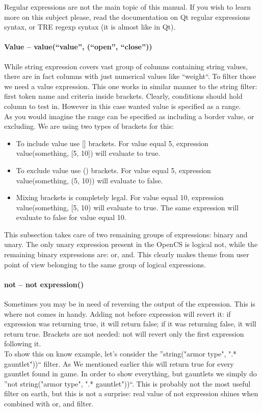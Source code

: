 Regular expressions are not the main topic of this manual. If you wish to learn more on this subject please, read the documentation on Qt regular expressions syntax, or TRE regexp syntax (it is almost like in Qt).

\paragraph{Value -- value(``value'', (``open'', ``close''))}
While string expression covers vast group of columns containing string values, there are in fact columns with just numerical values like ``weight``. To filter those we need a value expression. This one works in similar manner to the string filter: first token name and criteria inside brackets. Clearly, conditions should hold column to test in. However in this case wanted value is specified as a range.\\
As you would imagine the range can be specified as including a border value, or excluding. We are using two types of brackets for this:
\begin{itemize}
 \item To include value use [] brackets. For value equal 5, expression value(something, [5, 10]) will evaluate to true.
 \item To exclude value use () brackets. For value equal 5, expression value(something, (5, 10)) will evaluate to false.
 \item Mixing brackets is completely legal. For value equal 10, expression value(something, [5, 10) will evaluate to true. The same expression will evaluate to false for value equal 10.
\end{itemize}

This subsection takes care of two remaining groups of expressions: binary and unary. The only unary expression present in the OpenCS is logical not, while the remaining binary expressions are: or, and. This clearly makes theme from user point of view belonging to the same group of logical expressions.

\paragraph{not -- not expression()}
Sometimes you may be in need of reversing the output of the expression. This is where not comes in handy. Adding not before expression will revert it: if expression was returning true, it will return false; if it was returning false, it will return true. Brackets are not needed: not will revert only the first expression following it.\\
To show this on know example, let's consider the ''string("armor type", ".* gauntlet"))`` filter. As We mentioned earlier this will return true for every gauntlet found in game. In order to show everything, but gauntlets we simply do ''not string("armor type", ".* gauntlet"))``. This is probably not the most useful filter on earth, but this is not a surprise: real value of not expression shines when combined with or, and filter.


